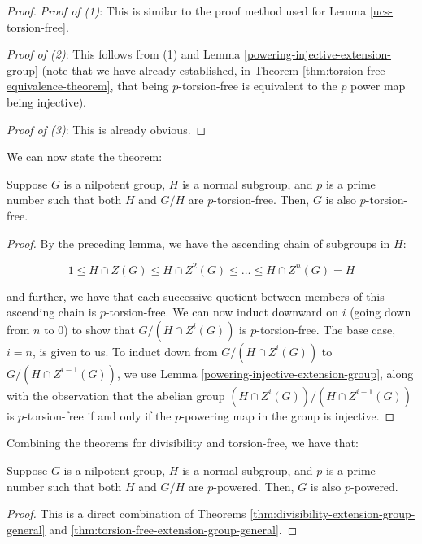 \documentclass{ucetd}
\begin{document}
\begin{proof}
  {\em Proof of (1)}: This is similar to the proof method used for
  Lemma \ref{ucs-torsion-free}. %

  {\em Proof of (2)}: This follows from (1) and Lemma
  \ref{powering-injective-extension-group} (note that we have already
  established, in Theorem \ref{thm:torsion-free-equivalence-theorem}, that
  being $p$-torsion-free is equivalent to the $p$ power map being
  injective).

  {\em Proof of (3)}: This is already obvious.
\end{proof}

We can now state the theorem:

\begin{theorem}\label{thm:torsion-free-extension-group-general}
  Suppose $G$ is a nilpotent group, $H$ is a normal subgroup, and $p$
  is a prime number such that both $H$ and $G/H$ are
  $p$-torsion-free. Then, $G$ is also $p$-torsion-free.
\end{theorem}

\begin{proof}
  By the preceding lemma, we have the ascending chain of subgroups in
  $H$:

  $$1 \le H \cap Z(G) \le H \cap Z^2(G) \le \dots \le H \cap Z^n(G) = H$$

  and further, we have that each successive quotient between members
  of this ascending chain is $p$-torsion-free. We can now induct
  downward on $i$ (going down from $n$ to $0$) to show that $G/(H \cap
  Z^i(G))$ is $p$-torsion-free. The base case, $i = n$, is given to
  us. To induct down from $G/(H \cap Z^i(G))$ to $G/(H \cap
  Z^{i-1}(G))$, we use Lemma \ref{powering-injective-extension-group},
  along with the observation that the abelian group $(H \cap
  Z^i(G))/(H \cap Z^{i-1}(G))$ is $p$-torsion-free if and only if the
  $p$-powering map in the group is injective.
\end{proof}

Combining the theorems for divisibility and torsion-free, we have that:

\begin{theorem}\label{powering-extension-group-general}
  Suppose $G$ is a nilpotent group, $H$ is a normal subgroup, and $p$
  is a prime number such that both $H$ and $G/H$ are
  $p$-powered. Then, $G$ is also $p$-powered.
\end{theorem}

\begin{proof}
  This is a direct combination of Theorems
  \ref{thm:divisibility-extension-group-general} and
  \ref{thm:torsion-free-extension-group-general}.
\end{proof}
\end{document}
